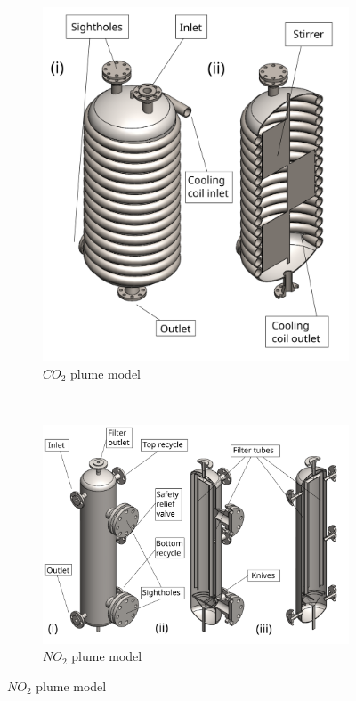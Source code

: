 \begin{figure}[t!]
    \centering
    \begin{subfigure}[t]{0.5\textwidth}
        \centering
        \includegraphics[width=\linewidth]{chapters/3-separation/figures/Crystalliser_schematic.svg}
        \caption{$CO_2$ plume model}
    \end{subfigure}%
    ~ 
    \begin{subfigure}[t]{0.5\textwidth}
        \centering
        \includegraphics[width=\linewidth]{chapters/3-separation/figures/Wash_column_schematic_executive.svg}
        \caption{$NO_2$ plume model}
    \end{subfigure}
\end{figure}